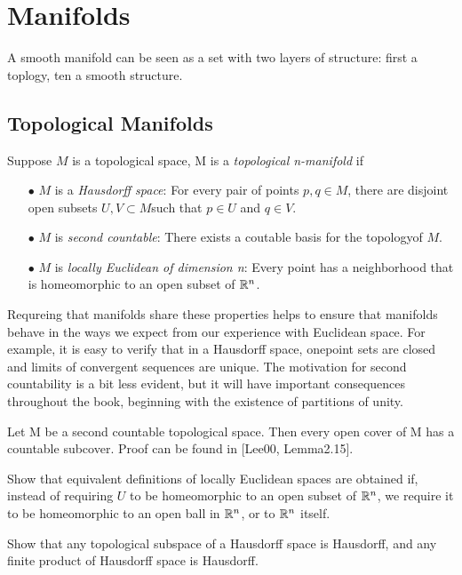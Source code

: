 \chapter{Manifolds}
A smooth manifold can be seen as a set with two layers of structure: first a toplogy,
ten a smooth structure.

\section{Topological Manifolds}
\begin{definition} 
Suppose $M$ is a topological space, M is a \emph{topological n-manifold} if
\begin{enumerate}
\item[$\bullet$] $M$ is a \emph{Hausdorff space}: For every pair of points $p,q \in M$, 
there are disjoint open subsets $U,V\subset M$such that $p\in U$ and $q\in V$.
\item[$\bullet$] $M$ is \emph{second countable}: There exists a coutable basis for 
the topologyof $M$.
\item[$\bullet$] $M$ is \emph{locally Euclidean of dimension n}: Every point has a 
neighborhood that is homeomorphic to an open subset of $\mathbb{R}^n$. 
\end{enumerate}
\end{definition}
Requreing that manifolds share these properties helps to ensure that manifolds behave
in the ways we expect from our experience with Euclidean space. For example, it is easy
to verify that in a Hausdorff space, onepoint sets are closed and limits of convergent
sequences are unique. The motivation for second countability is a bit less evident, 
but it will have important consequences throughout the book, beginning with the existence
of partitions of unity.
\begin{lem}
Let M be a second countable topological space. Then every open cover of M has a countable
subcover. Proof can be found in [Lee00, Lemma2.15].
\end{lem}
\begin{exer}
Show that equivalent definitions of locally Euclidean spaces are obtained if, instead of
requiring $U$ to be homeomorphic to an open subset of $\mathbb{R}^n$, we require it to be homeomorphic
to an open ball in $\mathbb{R}^n$, or to $\mathbb{R}^n$ itself.
\end{exer}
\begin{exer}
Show that any topological subspace of a Hausdorff space is Hausdorff, and any finite product of
Hausdorff space is Hausdorff.
\end{exer}
